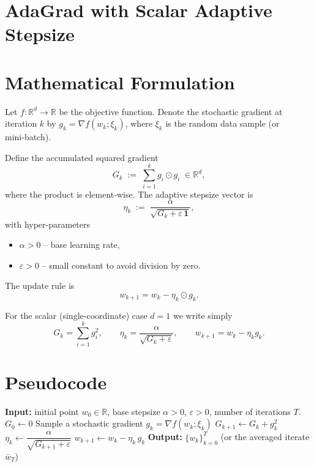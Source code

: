 \documentclass{article}
\begin{document}
\section*{AdaGrad with Scalar Adaptive Stepsize}

\section*{Mathematical Formulation}
Let $f:\mathbb{R}^d\rightarrow\mathbb{R}$ be the objective function.  
Denote the stochastic gradient at iteration $k$ by $g_k=\nabla f(w_k;\xi_k)$, where $\xi_k$ is the random data sample (or mini‑batch).  

Define the accumulated squared gradient
\[
G_k \;:=\; \sum_{i=1}^{k} g_i\odot g_i\;\in\mathbb{R}^{d},
\]
where the product is element‑wise.  
The adaptive stepsize vector is
\[
\eta_k \;:=\; \frac{\alpha}{\sqrt{G_k+\varepsilon\,\mathbf 1}},
\]
with hyper‑parameters
\begin{itemize}[nosep]
    \item $\alpha>0$ – base learning rate,
    \item $\varepsilon>0$ – small constant to avoid division by zero.
\end{itemize}
The update rule is
\[
w_{k+1}=w_k-\eta_k\odot g_k.
\tag{1}
\]

For the scalar (single‑coordinate) case $d=1$ we write simply
\[
G_k =\sum_{i=1}^{k} g_i^{2},\qquad 
\eta_k = \frac{\alpha}{\sqrt{G_k+\varepsilon}},\qquad 
w_{k+1}= w_k-\eta_k g_k .
\tag{2}
\]

\section*{Pseudocode}
\begin{algorithm}[H]
\caption{Scalar AdaGrad}
\begin{algorithmic}[1]
\State \textbf{Input:} initial point $w_0\in\mathbb{R}$, base stepsize $\alpha>0$, $\varepsilon>0$, number of iterations $T$.
\State $G_0\gets 0$ 
    \State Sample a stochastic gradient $g_k=\nabla f(w_k;\xi_k)$
    \State $G_{k+1}\gets G_k+g_k^{2}$ 
    \State $\eta_k \gets \dfrac{\alpha}{\sqrt{G_{k+1}+\varepsilon}}$
    \State $w_{k+1}\gets w_k-\eta_k\,g_k$ 
\EndFor
\State \textbf{Output:} $\{w_k\}_{k=0}^{T}$ (or the averaged iterate $\bar w_T$)
\end{algorithmic}
\end{algorithm}
\end{document}
